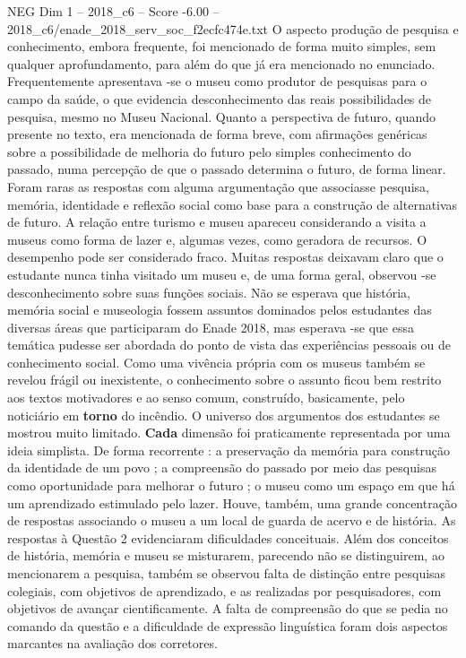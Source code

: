 \begin{textsample}{NEG Dim 1 – 2018\_c6 – Score -6.00 – 2018\_c6/enade\_2018\_serv\_soc\_f2ecfc474e.txt}
O aspecto produção de pesquisa e conhecimento, embora frequente, foi mencionado de forma muito simples, sem qualquer aprofundamento, para além do que já era mencionado no enunciado.
Frequentemente apresentava -se o museu como produtor de pesquisas para o campo da saúde, o que evidencia desconhecimento das reais possibilidades de pesquisa, mesmo no Museu Nacional.
Quanto a perspectiva de futuro, quando presente no texto, era mencionada de forma breve, com afirmações genéricas sobre a possibilidade de melhoria do futuro pelo simples conhecimento do passado, numa percepção de que o passado determina o futuro, de forma linear.
Foram raras as respostas com alguma argumentação que associasse pesquisa, memória, identidade e reflexão social como base para a construção de alternativas de futuro.
A relação entre turismo e museu apareceu considerando a visita a museus como forma de lazer e, algumas vezes, como geradora de recursos.
O desempenho pode ser considerado fraco.
Muitas respostas deixavam claro que o estudante nunca tinha visitado um museu e, de uma forma geral, observou -se desconhecimento sobre suas funções sociais.
Não se esperava que história, memória social e museologia fossem assuntos dominados pelos estudantes das diversas áreas que participaram do Enade 2018, mas esperava -se que essa temática pudesse ser abordada do ponto de vista das experiências pessoais ou de conhecimento social.
Como uma vivência própria com os museus também se revelou frágil ou inexistente, o conhecimento sobre o assunto ficou bem restrito aos textos motivadores e ao senso comum, construído, basicamente, pelo noticiário em \textbf{torno} do incêndio.
O universo dos argumentos dos estudantes se mostrou muito limitado. \textbf{Cada} dimensão foi praticamente representada por uma ideia simplista.
De forma recorrente : a preservação da memória para construção da identidade de um povo ; a compreensão do passado por meio das pesquisas como oportunidade para melhorar o futuro ; o museu como um espaço em que há um aprendizado estimulado pelo lazer.
Houve, também, uma grande concentração de respostas associando o museu a um local de guarda de acervo e de história.
As respostas à Questão 2 evidenciaram dificuldades conceituais.
Além dos conceitos de história, memória e museu se misturarem, parecendo não se distinguirem, ao mencionarem a pesquisa, também se observou falta de distinção entre pesquisas colegiais, com objetivos de aprendizado, e as realizadas por pesquisadores, com objetivos de avançar cientificamente.
A falta de compreensão do que se pedia no comando da questão e a dificuldade de expressão linguística foram dois aspectos marcantes na avaliação dos corretores.

\end{textsample}
